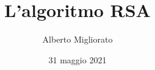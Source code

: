 \documentclass[a4paper,12pt]{article}
\begin{document}
\title{L'algoritmo RSA}
\author{Alberto Migliorato}
\date{31 maggio 2021}
\maketitle
\thispagestyle{empty}

\newpage
\tableofcontents
\newpage

\newpage

\newpage

\newpage


\end{document}

